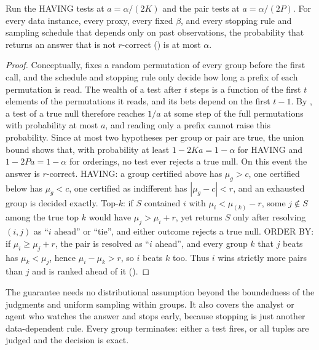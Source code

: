 \begin{theorem}
\label{thm:main}
Run the HAVING tests at $a=\alpha/(2K)$ and the pair tests at $a=\alpha/(2P)$.
For every data instance, every proxy, every fixed $\beta$, and every stopping rule and sampling schedule that depends only on past observations, the probability that \sys{} returns an answer that is not $r$-correct () is at most $\alpha$.
\end{theorem}
\begin{proof}
Conceptually, \sys{} fixes a random permutation of every group before the first call, and the schedule and stopping rule only decide how long a prefix of each permutation is read.
The wealth of a test after $t$ steps is a function of the first $t$ elements of the permutations it reads, and its bets depend on the first $t-1$.
By , a test of a true null therefore reaches $1/a$ at some step of the full permutations with probability at most $a$, and reading only a prefix cannot raise this probability.
Since at most two hypotheses per group or pair are true, the union bound shows that, with probability at least $1-2Ka=1-\alpha$ for HAVING and $1-2Pa=1-\alpha$ for orderings, no test ever rejects a true null.
On this event the answer is $r$-correct.
HAVING: a group certified above has $\mu_g>c$, one certified below has $\mu_g<c$, one certified as indifferent has $|\mu_g-c|<r$, and an exhausted group is decided exactly.
Top-$k$: if $S$ contained $i$ with $\mu_i<\mu_{(k)}-r$, some $j\notin S$ among the true top $k$ would have $\mu_j>\mu_i+r$, yet \sys{} returns $S$ only after resolving $(i,j)$ as ``$i$ ahead'' or ``tie'', and either outcome rejects a true null.
ORDER BY: if $\mu_i\ge\mu_j+r$, the pair is resolved as ``$i$ ahead'', and every group $k$ that $j$ beats has $\mu_k<\mu_j$, hence $\mu_i-\mu_k>r$, so $i$ beats $k$ too.
Thus $i$ wins strictly more pairs than $j$ and is ranked ahead of it ().
\end{proof}

The guarantee needs no distributional assumption beyond the boundedness of the judgments and uniform sampling within groups.
It also covers the analyst or agent who watches the answer and stops early, because stopping is just another data-dependent rule.
Every group terminates: either a test fires, or all tuples are judged and the decision is exact.
